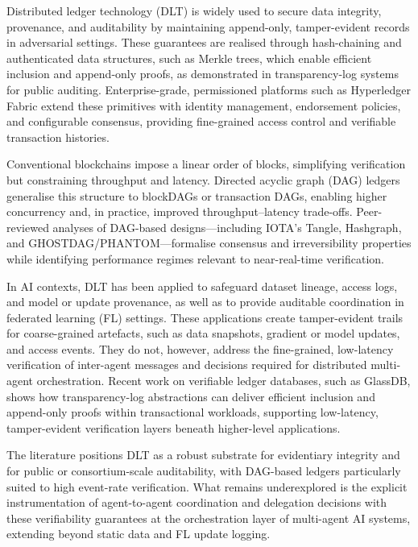 \documentclass[oneside,10pt]{swissi}
\begin{document}
Distributed ledger technology (DLT) is widely used to secure data integrity, provenance, and auditability by maintaining append-only, tamper-evident records in adversarial settings.\cite{nistir8202,nakamoto2008} These guarantees are realised through hash-chaining and authenticated data structures, such as Merkle trees, which enable efficient inclusion and append-only proofs, as demonstrated in transparency-log systems for public auditing.\cite{rfc9162,crosby2009,tomescu2019} Enterprise-grade, permissioned platforms such as Hyperledger Fabric extend these primitives with identity management, endorsement policies, and configurable consensus, providing fine-grained access control and verifiable transaction histories.\cite{androulaki2018}

Conventional blockchains impose a linear order of blocks, simplifying verification but constraining throughput and latency.\cite{nistir8202,nakamoto2008} Directed acyclic graph (DAG) ledgers generalise this structure to blockDAGs or transaction DAGs, enabling higher concurrency and, in practice, improved throughput–latency trade-offs.\cite{silvano2020,baird2016,sompolinsky2021} Peer-reviewed analyses of DAG-based designs—including IOTA’s Tangle, Hashgraph, and GHOSTDAG/PHANTOM—formalise consensus and irreversibility properties while identifying performance regimes relevant to near-real-time verification.\cite{silvano2020,baird2016,sompolinsky2021}

In AI contexts, DLT has been applied to safeguard dataset lineage, access logs, and model or update provenance, as well as to provide auditable coordination in federated learning (FL) settings.\cite{kuo2020,qu2022,ozdayi2020} These applications create tamper-evident trails for coarse-grained artefacts, such as data snapshots, gradient or model updates, and access events. They do not, however, address the fine-grained, low-latency verification of inter-agent messages and decisions required for distributed multi-agent orchestration. Recent work on verifiable ledger databases, such as GlassDB, shows how transparency-log abstractions can deliver efficient inclusion and append-only proofs within transactional workloads, supporting low-latency, tamper-evident verification layers beneath higher-level applications.\cite{yue2023}

The literature positions DLT as a robust substrate for evidentiary integrity and for public or consortium-scale auditability, with DAG-based ledgers particularly suited to high event-rate verification. What remains underexplored is the explicit instrumentation of agent-to-agent coordination and delegation decisions with these verifiability guarantees at the orchestration layer of multi-agent AI systems, extending beyond static data and FL update logging.\cite{qu2022,kuo2020}
\end{document}
